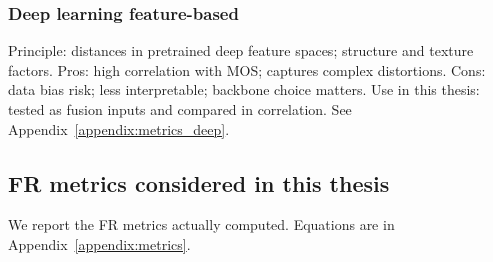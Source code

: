 \subsubsection{Deep learning feature-based}
Principle: distances in pretrained deep feature spaces; structure and texture factors.
Pros: high correlation with MOS; captures complex distortions.
Cons: data bias risk; less interpretable; backbone choice matters.
Use in this thesis: tested as fusion inputs and compared in correlation. See Appendix~\ref{appendix:metrics_deep}.

\subsection{FR metrics considered in this thesis}\label{sec:fr_metrics_table}
We report the FR metrics actually computed. Equations are in Appendix~\ref{appendix:metrics}.

